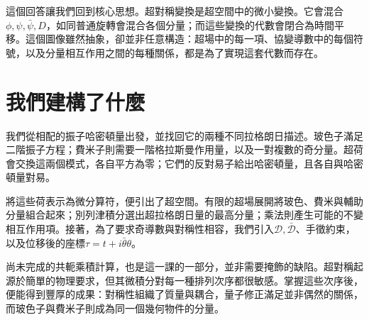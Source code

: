 \begin{classroomqa}
\end{classroomqa}

這個回答讓我們回到核心思想。超對稱變換是超空間中的微小變換。它會混合\(\phi,\psi,\bar\psi,D\)，如同普通旋轉會混合各個分量；而這些變換的代數會閉合為時間平移。這個圖像雖然抽象，卻並非任意構造：超場中的每一項、協變導數中的每個符號，以及分量相互作用之間的每種關係，都是為了實現這套代數而存在。

\section{我們建構了什麼}

我們從相配的振子哈密頓量出發，並找回它的兩種不同拉格朗日描述。玻色子滿足二階振子方程；費米子則需要一階格拉斯曼作用量，以及一對複數的奇分量。超荷會交換這兩個模式，各自平方為零；它們的反對易子給出哈密頓量，且各自與哈密頓量對易。

將這些荷表示為微分算符，便引出了超空間。有限的超場展開將玻色、費米與輔助分量組合起來；別列津積分選出超拉格朗日量的最高分量；乘法則產生可能的不變相互作用項。接著，為了要求奇導數與對稱性相容，我們引入\(\mathcal D,\bar{\mathcal D}\)、手徵約束，以及位移後的座標\(\tau=t+i\bar\theta\theta\)。

尚未完成的共軛乘積計算，也是這一課的一部分，並非需要掩飾的缺陷。超對稱起源於簡單的物理要求，但其微積分對每一種排列次序都很敏感。掌握這些次序後，便能得到豐厚的成果：對稱性組織了質量與耦合，量子修正滿足並非偶然的關係，而玻色子與費米子則成為同一個幾何物件的分量。
